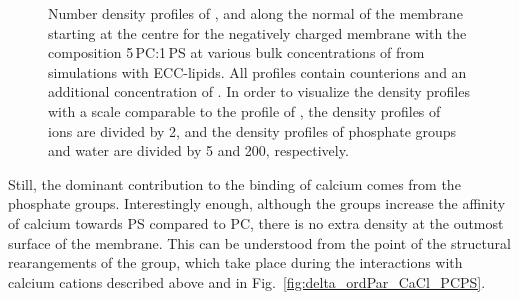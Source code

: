 \documentclass[journal=jpcbfk,manuscript=article]{achemso}
\begin{document}
\begin{figure}[htbp!]
{    Number density profiles of ,  and  along the normal of the membrane starting at the centre
    for the negatively charged membrane with the composition 5\,PC:1\,PS
    at various bulk concentrations of  from simulations with ECC-lipids. 
    All profiles contain  counterions and an additional concentration of . 
    In order to visualize the density profiles with a scale comparable to the profile of ,  
    the density profiles of~ ions are divided by 2, and 
    the density profiles of phosphate groups and water are divided by 5 and 200, respectively.  
  }
\end{figure} 
 


Still, the dominant contribution to the binding of calcium comes from the phosphate groups. 
Interestingly enough,
although the  groups increase the affinity of calcium towards PS compared to PC,
 there is no extra density at the outmost surface of the membrane. 
This can be understood from the point of the structural rearangements of the  group, 
which take place during the interactions with calcium cations
described above and in Fig.~\ref{fig:delta_ordPar_CaCl_PCPS}. 


\end{document}
